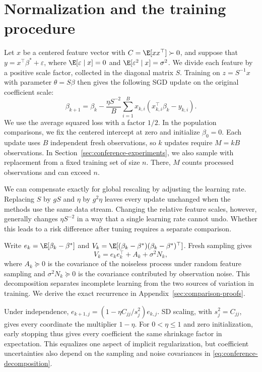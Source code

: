 \section{Normalization and the training procedure}
\label{sec:conference-setting}

Let $x$ be a centered feature vector with $C = \E[xx^\top] \succ 0$, and suppose
that $y = x^\top\beta^* + \varepsilon$, where $\E[\varepsilon\mid x] = 0$ and
$\E[\varepsilon^2\mid x] = \sigma^2$. We divide each feature by a positive scale
factor, collected in the diagonal matrix $S$. Training on $z = S^{-1}x$ with
parameter $\theta = S\beta$ then gives the following SGD update on the original
coefficient scale:
\begin{equation}
  \beta_{k+1}
  = \beta_k
    - \frac{\eta S^{-2}}{B} \sum_{i=1}^B x_{k,i}(x_{k,i}^\top\beta_k - y_{k,i}). \label{eq:conference-update}
\end{equation}
We use the average squared loss with a factor $1/2$. In the population
comparisons, we fix the centered intercept at zero and initialize $\beta_0 = 0$.
Each update uses $B$ independent fresh observations, so $k$ updates require
$M = kB$ observations. In Section~\ref{sec:conference-experiments}, we also
sample with replacement from a fixed training set of size $n$. There, $M$ counts
processed observations and can exceed $n$.

We can compensate exactly for global rescaling by adjusting the learning rate.
Replacing $S$ by $gS$ and $\eta$ by $g^2\eta$ leaves every update unchanged when
the methods use the same data stream. Changing the relative feature scales,
however, generally changes $\eta S^{-2}$ in a way that a single learning rate
cannot undo. Whether this leads to a risk difference after tuning requires a
separate comparison.

Write $e_k = \E[\beta_k-\beta^*]$ and
$V_k = \E[(\beta_k-\beta^*)(\beta_k-\beta^*)^\top]$. Fresh sampling gives
\begin{equation}
  V_k = e_ke_k^\top + A_k + \sigma^2N_k, \label{eq:conference-decomposition}
\end{equation}
where $A_k \succeq 0$ is the covariance of the noiseless process under random
feature sampling and $\sigma^2N_k \succeq 0$ is the covariance contributed by
observation noise. This decomposition separates incomplete learning from the two
sources of variation in training. We derive the exact recurrence in
Appendix~\ref{sec:comparison-proofs}.

Under independence, $e_{k+1,j} = (1 - \eta C_{jj}/s_j^2)e_{k,j}$. SD scaling,
with $s_j^2 = C_{jj}$, gives every coordinate the multiplier $1 - \eta$. For
$0 < \eta \leq 1$ and zero initialization, early stopping thus gives every
coefficient the same shrinkage factor in expectation. This equalizes one aspect
of implicit regularization, but coefficient uncertainties also depend on the
sampling and noise covariances in \eqref{eq:conference-decomposition}.

